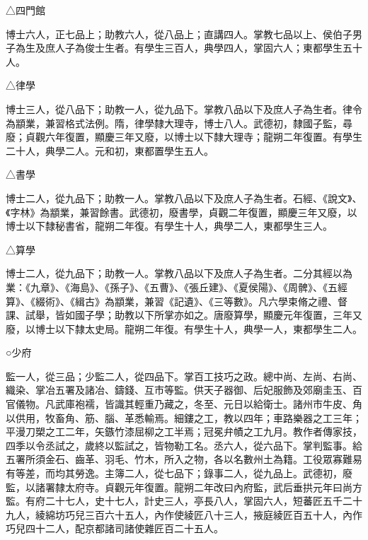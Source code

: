 \begin{pinyinscope}
 △四門館



 博士六人，正七品上；助教六人，從八品上；直講四人。掌教七品以上、侯伯子男子為生及庶人子為俊士生者。有學生三百人，典學四人，掌固六人；東都學生五十人。



 △律學



 博士三人，從八品下；助教一人，從九品下。掌教八品以下及庶人子為生者。律令為顓業，兼習格式法例。隋，律學隸大理寺，博士八人。武德初，隸國子監，尋廢；貞觀六年復置，顯慶三年又廢，以博士以下隸大理寺；龍朔二年復置。有學生二十人，典學二人。元和初，東都置學生五人。



 △書學



 博士二人，從九品下；助教一人。掌教八品以下及庶人子為生者。石經、《說文》、《字林》為顓業，兼習餘書。武德初，廢書學，貞觀二年復置，顯慶三年又廢，以博士以下隸秘書省，龍朔二年復。有學生十人，典學二人，東都學生三人。



 △算學



 博士二人，從九品下；助教一人。掌教八品以下及庶人子為生者。二分其經以為業：《九章》、《海島》、《孫子》、《五曹》、《張丘建》、《夏侯陽》、《周髀》、《五經算》、《綴術》、《緝古》為顓業，兼習《記遺》、《三等數》。凡六學束脩之禮、督課、試舉，皆如國子學；助教以下所掌亦如之。唐廢算學，顯慶元年復置，三年又廢，以博士以下隸太史局。龍朔二年復。有學生十人，典學一人，東都學生二人。



 ○少府



 監一人，從三品；少監二人，從四品下。掌百工技巧之政。總中尚、左尚、右尚、織染、掌冶五署及諸冶、鑄錢、互市等監。供天子器御、后妃服飾及郊廟圭玉、百官儀物。凡武庫袍襦，皆識其輕重乃藏之，冬至、元日以給衛士。諸州市牛皮、角以供用，牧畜角、筋、腦、革悉輸焉。細鏤之工，教以四年；車路樂器之工三年；平漫刀槊之工二年，矢鏃竹漆屈柳之工半焉；冠冕弁幘之工九月。教作者傳家技，四季以令丞試之，歲終以監試之，皆物勒工名。丞六人，從六品下。掌判監事。給五署所須金石、齒革、羽毛、竹木，所入之物，各以名數州土為籍。工役眾寡難易有等差，而均其勞逸。主簿二人，從七品下；錄事二人，從九品上。武德初，廢監，以諸署隸太府寺。貞觀元年復置。龍朔二年改曰內府監，武后垂拱元年曰尚方監。有府二十七人，史十七人，計史三人，亭長八人，掌固六人，短蕃匠五千二十九人，綾綿坊巧兒三百六十五人，內作使綾匠八十三人，掖庭綾匠百五十人，內作巧兒四十二人，配京都諸司諸使雜匠百二十五人。




\end{pinyinscope}
